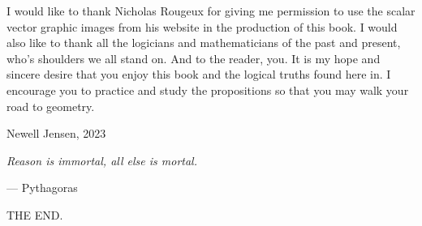 \documentclass[twoside,12pt]{report}
\begin{document}
I would like to thank Nicholas Rougeux for giving me permission to use the scalar vector graphic images from his website in the production of this book.  I would also like to thank all the logicians and mathematicians of the past and present, who's shoulders we all stand on.  And to the reader, you.  It is my hope and sincere desire that you enjoy this book and the logical truths found here in.  I encourage you to practice and study the propositions so that you may walk your {\color{cred}{o}}{\color{cblue}{w}}{\color{cyellow}{n}} road to geometry.

\hfill

\begin{flushright}
  Newell Jensen, 2023
\end{flushright}

\newpage

\vspace*{\fill}

\begin{center}
  \textit{Reason is immortal, all else is mortal.}

  \hspace{11em}--- Pythagoras
\end{center}

\vspace*{\fill}

\newpage

\tableofcontents

\newpage










\newpage

\thispagestyle{empty}
\vspace*{\fill}
\begin{center}
  \scshape{\LARGE{THE END.}}
\end{center}
\vspace*{\fill}
\end{document}
